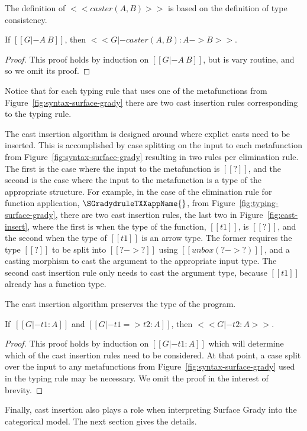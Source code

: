 \noindent
The definition of $<<caster(A,B)>>$ is based on the definition of type
consistency.
\begin{lemma}
  \label{lemma:type_consistency_and_caster}
  If $[[G |- A ~ B]]$, then $<<G |- caster(A,B) : A -> B>>$.
\end{lemma}
\begin{proof}
  This proof holds by induction on $[[G |- A ~ B]]$, but is vary
  routine, and so we omit its proof.
\end{proof}
\noindent
Notice that for each typing rule that uses one of the metafunctions
from Figure~\ref{fig:syntax-surface-grady} there are two cast
insertion rules corresponding to the typing rule.

The cast insertion algorithm is designed around where explict casts
need to be inserted.  This is accomplished by case splitting on the
input to each metafunction from Figure~\ref{fig:syntax-surface-grady}
resulting in two rules per elimination rule.  The first is the case
where the input to the metafunction is $[[?]]$, and the second is the
case where the input to the metafunction is a type of the appropriate
structure.  For example, in the case of the elimination rule for
function application, $\SGradydruleTXXappName{}$, from
Figure~\ref{fig:typing-surface-grady}, there are two cast insertion
rules, the last two in Figure~\ref{fig:cast-insert}, where the first
is when the type of the function, $[[t1]]$, is $[[?]]$, and the second
when the type of $[[t1]]$ is an arrow type.  The former requires the
type $[[?]]$ to be split into $[[? -> ?]]$ using $[[unbox (? -> ?)]]$,
and a casting morphism to cast the argument to the appropriate input
type.  The second cast insertion rule only needs to cast the argument
type, because $[[t1]]$ already has a function type.

The cast insertion algorithm preserves the type of the program.
\begin{lemma}
  \label{lemma:cast_insertion_preserves_the_type}
  If $\,[[G |- t1 : A]]$ and $[[G |- t1 => t2 : A]]$, then $<<G |- t2 : A>>$.
\end{lemma}
\begin{proof}
  This proof holds by induction on $[[G |- t1 : A]]$ which will
  determine which of the cast insertion rules need to be considered.
  At that point, a case split over the input to any metafunctions from
  Figure~\ref{fig:syntax-surface-grady} used in the typing rule may be
  necessary.  We omit the proof in the interest of brevity.
\end{proof}
\noindent
Finally, cast insertion also plays a role when interpreting Surface
Grady into the categorical model.  The next section gives the details.


